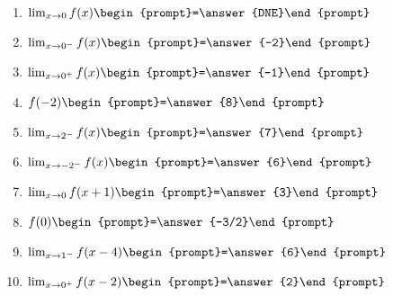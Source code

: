 \documentclass{ximera}
\begin{document}
\begin{question}
\begin{enumerate}
\item $\lim_{x\to 0} f(x) \begin{prompt}=\answer{DNE}\end{prompt}$ 
\item $\lim_{x\to 0^-} f(x) \begin{prompt}=\answer{-2}\end{prompt}$  
\item $\lim_{x\to 0^+} f(x) \begin{prompt}=\answer{-1}\end{prompt}$  
\item $f(-2) \begin{prompt}=\answer{8}\end{prompt}$  
\item $\lim_{x\to 2^-} f(x) \begin{prompt}=\answer{7}\end{prompt}$  
\item $\lim_{x\to -2^-} f(x) \begin{prompt}=\answer{6}\end{prompt}$  
\item $\lim_{x\to 0} f(x+1) \begin{prompt}=\answer{3}\end{prompt}$  
\item $f(0) \begin{prompt}=\answer{-3/2}\end{prompt}$ 
\item $\lim_{x\to 1^-} f(x-4) \begin{prompt}=\answer{6}\end{prompt}$  
\item $\lim_{x\to 0^+} f(x-2) \begin{prompt}=\answer{2}\end{prompt}$
\end{enumerate}
\end{question}
\end{document}

